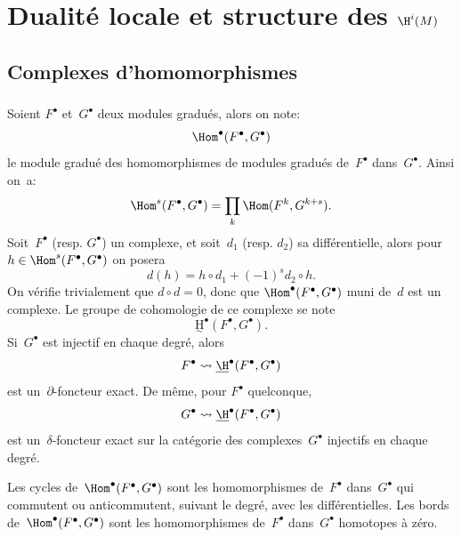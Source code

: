 \chapter{Dualit\'e locale et structure des $\H^i(M)$}\label{V}

\renewcommand{\theequation}{\arabic{equation}}

\section{Complexes d'homomorphismes} \label{V.1}

\subsection{} \label{V.1.1}
Soient $F^{\bullet}$ et~$G^{\bullet}$ deux modules gradu\'es, alors on note:
\begin{equation} \label{eq:V.1} \Hom^{\bullet}(F^{\bullet}, G^{\bullet})
\end{equation}
le module gradu\'e des homomorphismes de modules gradu\'es de~$F^{\bullet}$ dans~$G^{\bullet}$. Ainsi on~a:
\begin{equation} \label{eq:V.2} \Hom^{s}(F^{\bullet}, G^{\bullet})=\prod_{k}\Hom(F^{k}, G^{k+s}).
\end{equation}
Soit~$F^{\bullet}$ (resp. $G^{\bullet}$) un complexe, et soit~$d_{1}$ (resp. $d_{2}$) sa diff\'erentielle, alors pour $h\in\Hom^{s}(F^{\bullet}, G^{\bullet})$ on posera
\begin{equation} \label{eq:V.3} d(h)=h\circ d_{1}+(-1)^{s}d_{2}\circ h.
\end{equation}
On v\'erifie trivialement que $d\circ d=0$, donc que $\Hom^{\bullet}(F^{\bullet}, G^{\bullet})$ muni de~$d$ est un complexe. Le groupe de cohomologie de ce complexe se note
\begin{equation} \label{eq:V.4} \underset{\sim}{\mathrm{H}}^{\bullet}(F^{\bullet}, G^{\bullet}).
\end{equation}
Si~$G^{\bullet}$ est injectif en chaque degr\'e, alors
$$F^{\bullet}\rightsquigarrow\underline{\H}^{\bullet}(F^{\bullet}, G^{\bullet})$$
est un~$\partial$-foncteur exact. De m\^eme, pour $F^{\bullet}$ quelconque,
$$G^{\bullet}\rightsquigarrow\underline{\H}^{\bullet}(F^{\bullet}, G^{\bullet})$$
est un~$\delta$-foncteur exact sur la cat\'egorie des complexes~$G^{\bullet}$ injectifs en chaque degr\'e.

\begin{remarque} \label{V.1.2}
Les cycles de~$\Hom^{\bullet}(F^{\bullet}, G^{\bullet})$ sont les homomorphismes de~$F^{\bullet}$ dans~$G^{\bullet}$ qui commutent ou anticommutent, suivant le degr\'e, avec les diff\'erentielles. Les bords de~$\Hom^{\bullet}(F^{\bullet}, G^{\bullet})$ sont les homomorphismes de~$F^{\bullet}$ dans~$G^{\bullet}$ homotopes \`a z\'ero.
\end{remarque}

